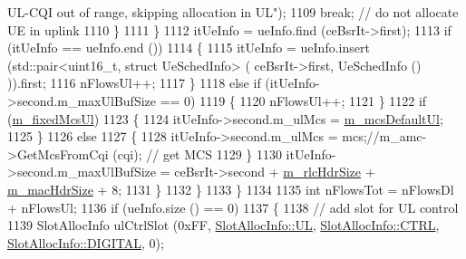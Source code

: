 \begin{DoxyCode}
{       UL-CQI out of range, skipping allocation in UL"});
1109                                                 \textcolor{keywordflow}{break};  \textcolor{comment}{// do not allocate UE in uplink}
1110                                         \}
1111                                 \}
1112                                 itUeInfo = ueInfo.find (ceBsrIt->first);
1113                                 \textcolor{keywordflow}{if} (itUeInfo == ueInfo.end ())
1114                                 \{
1115                                         itUeInfo = ueInfo.insert (std::pair<uint16\_t, struct UeSchedInfo> (
      ceBsrIt->first, UeSchedInfo () )).first;
1116                                         nFlowsUl++;
1117                                 \}
1118                                 \textcolor{keywordflow}{else} \textcolor{keywordflow}{if} (itUeInfo->second.m\_maxUlBufSize == 0)
1119                                 \{
1120                                         nFlowsUl++;
1121                                 \}
1122                                 \textcolor{keywordflow}{if} (\hyperlink{classns3_1_1MmWaveFlexTtiMacScheduler_adcb65237e784d0154cc892e9eafdc883}{m\_fixedMcsUl})
1123                                 \{
1124                                         itUeInfo->second.m\_ulMcs = 
      \hyperlink{classns3_1_1MmWaveFlexTtiMacScheduler_a9f55a65641298174b3674300bc45f5a0}{m\_mcsDefaultUl};
1125                                 \}
1126                                 \textcolor{keywordflow}{else}
1127                                 \{
1128                                         itUeInfo->second.m\_ulMcs = mcs;\textcolor{comment}{//m\_amc->GetMcsFromCqi (cqi);  //
       get MCS}
1129                                 \}
1130                                 itUeInfo->second.m\_maxUlBufSize = ceBsrIt->second + 
      \hyperlink{classns3_1_1MmWaveFlexTtiMacScheduler_a2c5b4f384597954f87952522bd1fa94f}{m\_rlcHdrSize} + \hyperlink{classns3_1_1MmWaveFlexTtiMacScheduler_a4f51deebfee8f21e01647d3812c17929}{m\_macHdrSize} + 8;
1131                         \}
1132                 \}
1133         \}
1134 
1135         \textcolor{keywordtype}{int} nFlowsTot = nFlowsDl + nFlowsUl;
1136         \textcolor{keywordflow}{if} (ueInfo.size () == 0)
1137         \{
1138                 \textcolor{comment}{// add slot for UL control}
1139                 SlotAllocInfo ulCtrlSlot (0xFF, \hyperlink{structns3_1_1SlotAllocInfo_a6cad60db1d39034f1851e2cea625fe5da916b5be54594ead6ed677c570311cad2}{SlotAllocInfo::UL}, 
      \hyperlink{structns3_1_1SlotAllocInfo_a3ea7cb503bfd0c9a4df55a71b81b9331ad78b7d76ef82d56c33be1fa9c1867409}{SlotAllocInfo::CTRL}, \hyperlink{structns3_1_1SlotAllocInfo_adcbd067d82be6260b3399167d8f0b4eca47a67c342db658a08ded9ce4b49417ea}{SlotAllocInfo::DIGITAL}, 0);

\end{DoxyCode}
